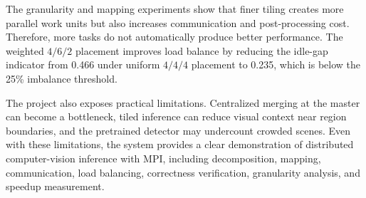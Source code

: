 The granularity and mapping experiments show that finer tiling creates more parallel work units but also increases communication and post-processing cost. Therefore, more tasks do not automatically produce better performance. The weighted $4/6/2$ placement improves load balance by reducing the idle-gap indicator from 0.466 under uniform $4/4/4$ placement to 0.235, which is below the 25\% imbalance threshold.

The project also exposes practical limitations. Centralized merging at the master can become a bottleneck, tiled inference can reduce visual context near region boundaries, and the pretrained detector may undercount crowded scenes. Even with these limitations, the system provides a clear demonstration of distributed computer-vision inference with MPI, including decomposition, mapping, communication, load balancing, correctness verification, granularity analysis, and speedup measurement.
